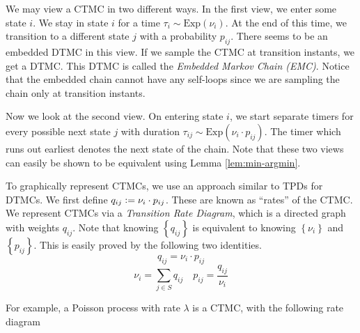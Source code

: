 \documentclass[12pt]{article}
\theoremstyle{definition}
\begin{document}
    \medskip
    
    We may view a CTMC in two different ways. In the first view, we enter some state $i$. We stay in state $i$ for a time $\tau_i \sim \text{Exp}(\nu_i)$. At the end of this time, we transition to a different state $j$ with a probability $p_{ij}$. There seems to be an embedded DTMC in this view. If we sample the CTMC at transition instants, we get a DTMC. This DTMC is called the \emph{Embedded Markov Chain (EMC)}. Notice that the embedded chain cannot have any self-loops since we are sampling the chain only at transition instants. 
    
    \medskip
    
    Now we look at the second view. On entering state $i$, we start separate timers for every possible next state $j$ with duration $\tau_{ij} \sim \text{Exp}(\nu_i \cdot p_{ij})$. The timer which runs out earliest denotes the next state of the chain. Note that these two views can easily be shown to be equivalent using Lemma \ref{lem:min-argmin}.
    
    \medskip
    
    To graphically represent CTMCs, we use an approach similar to TPDs for DTMCs. We first define $q_{ij} \vcentcolon= \nu_i \cdot p_{ij}$. These are known as ``rates'' of the CTMC. We represent CTMCs via a \emph{Transition Rate Diagram}, which is a directed graph with weights $q_{ij}$. Note that knowing $\left\{q_{ij}\right\}$ is equivalent to knowing $\left\{\nu_i\right\}$ and $\left\{p_{ij}\right\}$. This is easily proved by the following two identities.
    \[
        q_{ij} = \nu_{i} \cdot p_{ij}
    \]
    \[
        \nu_i = \sum_{j \in S} q_{ij} \quad p_{ij} = \frac{q_{ij}}{\nu_i}
    \]

    For example, a Poisson process with rate $\lambda$ is a CTMC, with the following rate diagram    
    
    \begin{center}
\end{center}
\end{document}

